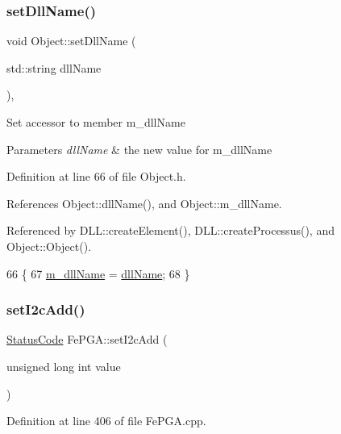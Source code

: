 \subsubsection{\texorpdfstring{set\+Dll\+Name()}{setDllName()}}
{\footnotesize\ttfamily void Object\+::set\+Dll\+Name (\begin{DoxyParamCaption}\item[{std\+::string}]{dll\+Name }\end{DoxyParamCaption})\hspace{0.3cm}{\ttfamily [inline]}, {\ttfamily [inherited]}}

Set accessor to member m\+\_\+dll\+Name 
\begin{DoxyParams}{Parameters}
{\em dll\+Name} & the new value for m\+\_\+dll\+Name \\
\hline
\end{DoxyParams}


Definition at line 66 of file Object.\+h.



References Object\+::dll\+Name(), and Object\+::m\+\_\+dll\+Name.



Referenced by D\+L\+L\+::create\+Element(), D\+L\+L\+::create\+Processus(), and Object\+::\+Object().


\begin{DoxyCode}
66                                       \{
67     \hyperlink{classObject_a01afbeacebb8db6831559972ec362eb3}{m\_dllName} = \hyperlink{classObject_a2e3947f2870094c332d7454117f3ec63}{dllName};
68   \}
\end{DoxyCode}
\mbox{\label{classFePGA_a2da860f836e04ecc54056d0bf8cc8f98}} 
\subsubsection{\texorpdfstring{set\+I2c\+Add()}{setI2cAdd()}}
{\footnotesize\ttfamily \hyperlink{classStatusCode}{Status\+Code} Fe\+P\+G\+A\+::set\+I2c\+Add (\begin{DoxyParamCaption}\item[{unsigned long int}]{value }\end{DoxyParamCaption})}



Definition at line 406 of file Fe\+P\+G\+A.\+cpp.




